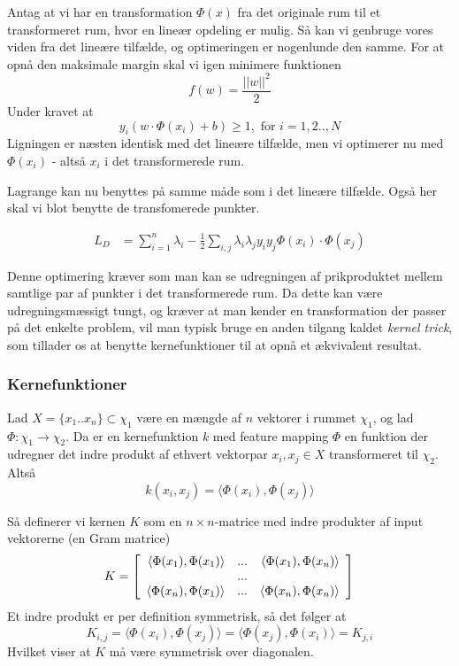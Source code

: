 \documentclass{article}
\begin{document}
Antag at vi har en transformation $\Phi(x)$ fra det originale rum til et transformeret rum, hvor en lineær opdeling er mulig. Så kan vi genbruge vores viden fra det lineære tilfælde, og optimeringen er nogenlunde den samme. For at opnå den maksimale margin skal vi igen minimere funktionen 
$$f(w)=\frac{||w||^2}{2}$$
Under kravet at
$$y_i(w\cdot\Phi(x_i)+b)\geq 1,\text{ for }i=1,2..,N$$
Ligningen er næsten identisk med det lineære tilfælde, men vi optimerer nu med $\Phi(x_i)$ - altså $x_i$ i det transformerede rum.

Lagrange kan nu benyttes på samme måde som i det lineære tilfælde. Også her skal vi blot benytte de transfomerede punkter.

\begin{align*}
L_D&=\sum_{i=1}^{n}\lambda_i-\frac{1}{2}\sum_{i,j}\lambda_i\lambda_j y_iy_j\Phi(x_i)\cdot\Phi(x_j)
\end{align*}

Denne optimering kræver som man kan se udregningen af prikproduktet mellem samtlige par af punkter i det transformerede rum. Da dette kan være udregningsmæssigt tungt, og kræver at man kender en transformation der passer på det enkelte problem, vil man typisk bruge en anden tilgang kaldet \textit{kernel trick}, som tillader os at benytte kernefunktioner til at opnå et ækvivalent resultat.


\subsubsection{Kernefunktioner}
Lad $X=\{x_1..x_n\}\subset \chi_1$ være en mængde af $n$ vektorer i rummet $\chi_1$, og lad $\Phi:\chi_1\rightarrow\chi_2$. Da er en kernefunktion $k$ med feature mapping $\Phi$ en funktion der udregner det indre produkt af ethvert vektorpar $x_i,x_j\in X$ transformeret til $\chi_2$. Altså
\begin{equation}
k(x_i,x_j)=\langle\Phi(x_i),\Phi(x_j)\rangle
\end{equation}

Så definerer vi kernen $K$ som en $n\times n$-matrice med indre produkter af input vektorerne (en Gram matrice)
\begin{equation}
K=\left[\begin{array}{r r r}
\langle\Phi(x_1),\Phi(x_1)\rangle & ... & \langle\Phi(x_1),\Phi(x_n)\rangle\\
 & ... & \\
\langle\Phi(x_n),\Phi(x_1)\rangle & ... & \langle\Phi(x_n),\Phi(x_n)\rangle\\
\end{array}\right]\\
\end{equation}
Et indre produkt er per definition symmetrisk, så det følger at
\begin{equation}
K_{i,j}=\langle\Phi(x_i),\Phi(x_j)\rangle=\langle\Phi(x_j),\Phi(x_i)\rangle=K_{j,i}
\end{equation}
Hvilket viser at $K$ må være symmetrisk over diagonalen. 
\end{document}
